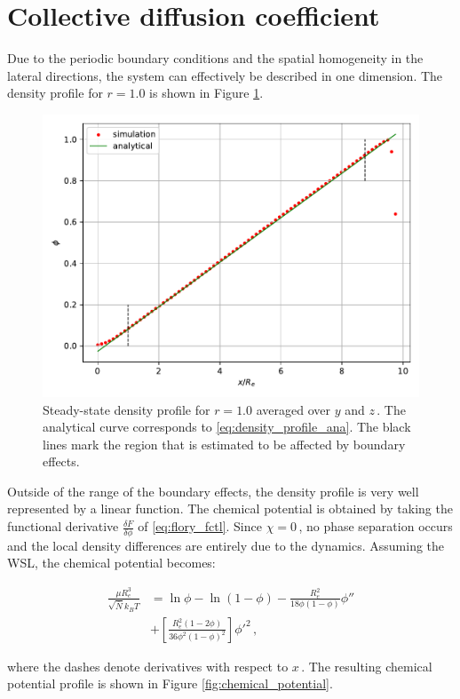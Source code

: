 \documentclass[bachelor,       %
               twoside,        %
               BCOR10mm,       %
               ngerman, english %
               ]{GAUBM}
\begin{document}
\section{Collective diffusion coefficient}
\label{sec:colldiff}

Due to the periodic boundary conditions and the spatial homogeneity in the lateral directions, the system can effectively be described in one dimension. The density profile for $r=1.0$ is shown in Figure \ref{fig:density_profile}.

\begin{figure}[h]
  \centering
  \includegraphics[width=0.6\linewidth]{figures/density_coll_diff.pdf}
  \caption{Steady-state density profile for $r=1.0$ averaged over $y$ and $z\,$. The analytical curve corresponds to \eqref{eq:density_profile_ana}. The black lines mark the region that is estimated to be affected by boundary effects.}
  \label{fig:density_profile}
\end{figure}

Outside of the range of the boundary effects, the density profile is very well represented by a linear function. The chemical potential is obtained by taking the functional derivative $\frac{\delta F}{\delta\phi}$ of \eqref{eq:flory_fctl}. Since $\chi=0\,$, no phase separation occurs and the local density differences are entirely due to the dynamics. Assuming the WSL, the chemical potential becomes:


\begin{align}
  \frac{\mu R_e^3}{\sqrt{\bar N} k_BT}&=\ln\phi-\ln(1-\phi)-\frac{R_e^2}{18\phi(1-\phi)}\phi''\nonumber \\ &+\left[\frac{R_e^2(1-2\phi)}{36\phi^2(1-\phi)^2}\right]\phi'^2\,,
  \label{eq:mu_flory}
\end{align}

where the dashes denote derivatives with respect to $x\,.$ The resulting chemical potential profile is shown in Figure \ref{fig:chemical_potential}.
\end{document}
